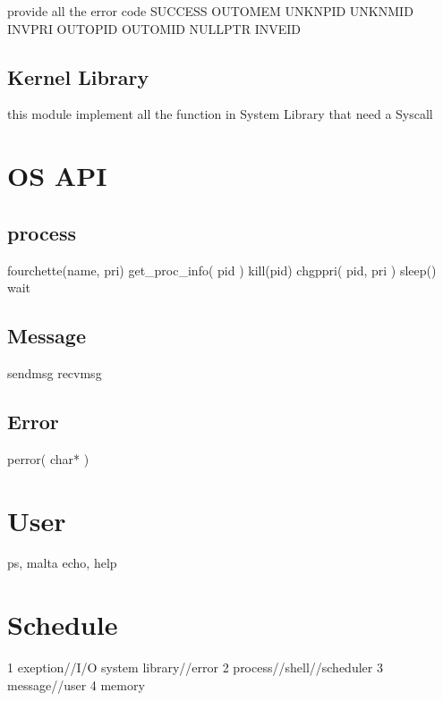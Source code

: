 provide all the error code
SUCCESS
OUTOMEM
UNKNPID
UNKNMID
INVPRI
OUTOPID
OUTOMID
NULLPTR
INVEID

\section{Kernel Library}

this module implement all the function in System Library that need a Syscall

\chapter{OS API}

\section{process}

fourchette(name, pri)
get\_proc\_info( pid )
kill(pid)
chgppri( pid, pri )
sleep()
wait

\section{Message}

sendmsg
recvmsg

\section{Error}

perror( char* )

\chapter{User}

ps, malta echo, help

\chapter{Schedule}

1 exeption//I/O \lra system library//error
2 process//shell//scheduler
3 message//user
4 memory
